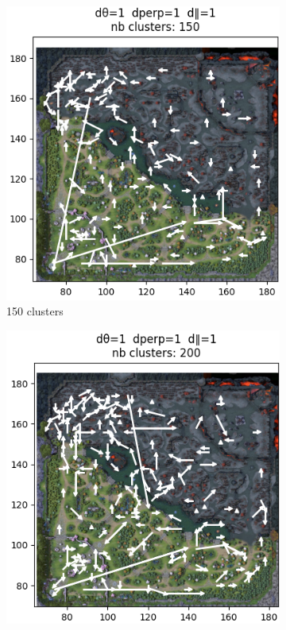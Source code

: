\begin{figure}[h!]
\begin{subfigure}[b]{0.24\textwidth}
         \includegraphics[width=\textwidth]{Images/kmedoid/kmed_150.png}
         \caption{150 clusters}
         \label{fig:kmed_150}
     \end{subfigure}
     \hfill
     \begin{subfigure}[b]{0.24\textwidth}
         \centering
         \includegraphics[width=\textwidth]{Images/kmedoid/kmed_200.png}

\end{subfigure}
\end{figure}
